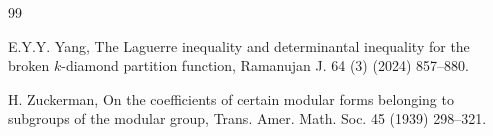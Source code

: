 \documentclass[12pt]{article}
\numberwithin{equation}{section}
\begin{document}
\begin{thebibliography}{99}
%

E.Y.Y. Yang, The Laguerre inequality and determinantal inequality for the broken $k$-diamond partition function, Ramanujan J. 64 (3) (2024) 857--880.

H. Zuckerman, On the coefficients of certain modular forms belonging to subgroups of the modular group, Trans. Amer. Math. Soc. 45 (1939) 298--321.

\end{thebibliography}
\end{document}
